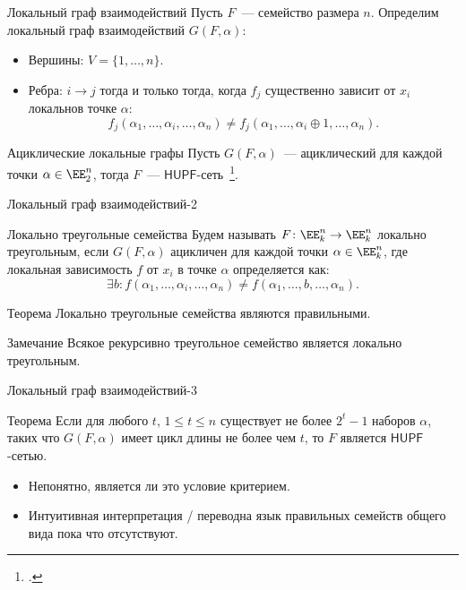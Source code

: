 \begin{frame}{Локальный граф взаимодействий}
    Пусть $F$~--- семейство размера $n$.
    Определим локальный граф взаимодействий $G(F, \alpha)$:
    \pause 
    \begin{itemize}
      \item Вершины: $V = \{1, \ldots, n\}$.
      \pause
      \item Ребра: $i \to j$ тогда и только тогда, когда $f_j$ существенно зависит от $x_i$  \guillemotleft локально\guillemotright в точке $\alpha$:
      \[
          f_j(\alpha_1, \ldots, \alpha_i, \ldots, \alpha_n) \ne f_j(\alpha_1, \ldots, \alpha_i \oplus 1, \ldots, \alpha_n).
      \]
    \end{itemize}
    \pause 
    \begin{exampleblock}{Ациклические локальные графы}
        Пусть $G(F, \alpha)$~--- ациклический для каждой точки $\alpha \in \EE_2^n$, тогда $F$~--- $\mathsf{HUPF}$-сеть~\footcite{shih2005combinatorial}.
    \end{exampleblock}
\end{frame}


\begin{frame}{Локальный граф взаимодействий-2}
    \begin{alertblock}{Локально треугольные семейства}
        Будем называть $F \colon \EE_k^n \to \EE_k^n $ локально треугольным, если $G(F, \alpha)$ ацикличен для каждой точки $\alpha \in \EE_k^n$, где локальная зависимость $f$ от $x_i$ в точке $\alpha$ определяется как:
        \[
            \exists b \colon f(\alpha_1, \ldots, \alpha_i, \ldots, \alpha_n) \ne f(\alpha_1, \ldots, b, \ldots, \alpha_n).
        \]
    \end{alertblock}
    \pause 
    \begin{alertblock}{Теорема}
        Локально треугольные семейства являются правильными.
    \end{alertblock}
    \pause
    \begin{alertblock}{Замечание}
        Всякое рекурсивно треугольное семейство является локально треугольным.
    \end{alertblock}
\end{frame}


\begin{frame}{Локальный граф взаимодействий-3}
    \begin{exampleblock}{Теорема}
        Если для любого $t$, $1 \le t \le n$ существует не более $2^t - 1$ наборов $\alpha$, таких что $G(F, \alpha)$ имеет цикл длины не более чем $t$, то $F$ является $\mathsf{HUPF}$-сетью.
    \end{exampleblock}
    \pause 
    \begin{itemize}
        \item Непонятно, является ли это условие критерием.
        \pause
        \item Интуитивная интерпретация /  \guillemotleft перевод\guillemotright на язык правильных семейств общего вида пока что отсутствуют.
    \end{itemize}
\end{frame}


